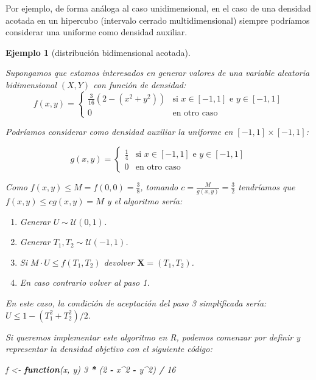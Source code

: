 \documentclass[
  spanish,
  10pt,
]{book}
\newenvironment{Shaded}{\begin{snugshade}}{\end{snugshade}}
\newcommand{\ControlFlowTok}[1]{\textcolor[rgb]{0.13,0.29,0.53}{\textbf{#1}}}
\newcommand{\DecValTok}[1]{\textcolor[rgb]{0.00,0.00,0.81}{#1}}
\newcommand{\NormalTok}[1]{#1}
\newcommand{\OtherTok}[1]{\textcolor[rgb]{0.56,0.35,0.01}{#1}}
\newcommand{\SpecialCharTok}[1]{\textcolor[rgb]{0.81,0.36,0.00}{\textbf{#1}}}
\renewcommand{\mathbf}[1]{\symbf{#1}}
\theoremstyle{break}
\newtheorem{example}{Ejemplo}[chapter]
\theoremstyle{nonumberplain}
\begin{document}
Por ejemplo, de forma análoga al caso unidimensional, en el caso de una densidad acotada en un hipercubo (intervalo cerrado multidimensional) siempre podríamos considerar una uniforme como densidad auxiliar.

\begin{example}[distribución bidimensional acotada]
\protect\hypertarget{exm:ar-bidim}{}\label{exm:ar-bidim}

Supongamos que estamos interesados en generar valores de una variable aleatoria bidimensional
\(\left( X,Y\right)\) con función de densidad:
\[f(x,y)= \left\{ 
\begin{array}{cl}
\frac{3}{16}\left( 2-\left( x^2+y^2\right) \right)  & \text{si }x\in
[-1, 1]\text{ e }y \in [-1, 1] \\ 
0 & \text{en otro caso}
\end{array}
\right.\]

Podríamos considerar como densidad auxiliar la uniforme en \([-1, 1] \times [-1, 1]\):

\[g\left( x, y \right) = \left\{
\begin{array}{ll}
\frac{1}{4} & \text{si }x \in [-1, 1] \text{ e }y\in [-1, 1] \\
0 &  \text{en otro caso}
\end{array}\right.\]

Como \(f(x, y) \leq M = f(0,0) = \frac38\), tomando \(c= \frac{M}{g(x,y)} = \frac32\)
tendríamos que \(f(x,y) \leq cg(x,y) = M\) y el algoritmo sería:

\begin{enumerate}
\def\labelenumi{\arabic{enumi}.}
\item
  Generar \(U \sim \mathcal{U}\left( 0, 1\right)\).
\item
  Generar \(T_1, T_2  \sim \mathcal{U}\left( -1, 1 \right)\).
\item
  Si \(M \cdot U\leq f(T_1, T_2)\)
  devolver \(\mathbf{X} = (T_1, T_2)\).
\item
  En caso contrario volver al paso 1.
\end{enumerate}

En este caso, la condición de aceptación del paso 3 simplificada sería:
\(U \leq 1 - \left( T_1^2 + T_2^2 \right) / 2\).

Si queremos implementar este algoritmo en R, podemos comenzar por
definir y representar la densidad objetivo con el siguiente código:

\begin{Shaded}
\begin{Highlighting}[]
\NormalTok{f }\OtherTok{\textless{}{-}} \ControlFlowTok{function}\NormalTok{(x, y) }\DecValTok{3} \SpecialCharTok{*}\NormalTok{ (}\DecValTok{2} \SpecialCharTok{{-}}\NormalTok{ x}\SpecialCharTok{\^{}}\DecValTok{2} \SpecialCharTok{{-}}\NormalTok{ y}\SpecialCharTok{\^{}}\DecValTok{2}\NormalTok{) }\SpecialCharTok{/} \DecValTok{16}


\end{Highlighting}
\end{Shaded}
\end{example}
\end{document}
